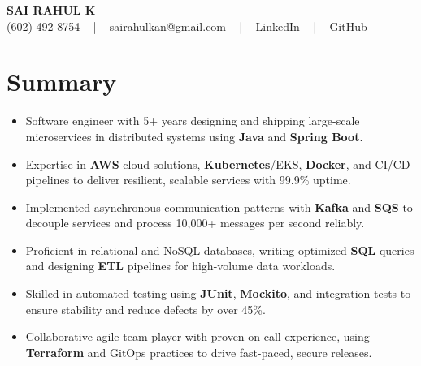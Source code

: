 \documentclass[letterpaper,11pt]{article}
\newcommand{\resumeItem}[1]{
  \item\footnotesize{
    {#1 \vspace{-2pt}}
  }
}
\newcommand{\resumeItemListStart}{\begin{itemize}[leftmargin=*]}
\newcommand{\resumeItemListEnd}{\end{itemize}\vspace{-5pt}}
\begin{document}
\begin{center}
    {\fontsize{14pt}{12pt}\selectfont \textbf{\MakeUppercase{Sai Rahul K}}}\\ \vspace{2pt}
    \fontsize{10pt}{12pt}\selectfont (602) 492-8754 ~ | ~ \href{mailto:sairahulkan@gmail.com}{sairahulkan@gmail.com} ~ | ~
    \href{https://www.linkedin.com/in/rq123/}{\color{blue}\underline{LinkedIn}} ~ | ~
    \href{https://github.com/kanrahuldo}{\color{blue}\underline{GitHub}}~
    \vspace{-8pt}
\end{center}

\section{Summary}
\fontsize{9pt}{10pt}\selectfont
\resumeItemListStart
    \resumeItem{Software engineer with 5+ years designing and shipping large-scale microservices in distributed systems using \textbf{Java} and \textbf{Spring Boot}.}
    \resumeItem{Expertise in \textbf{AWS} cloud solutions, \textbf{Kubernetes}/EKS, \textbf{Docker}, and CI/CD pipelines to deliver resilient, scalable services with 99.9\% uptime.}
    \resumeItem{Implemented asynchronous communication patterns with \textbf{Kafka} and \textbf{SQS} to decouple services and process 10,000+ messages per second reliably.}
    \resumeItem{Proficient in relational and NoSQL databases, writing optimized \textbf{SQL} queries and designing \textbf{ETL} pipelines for high-volume data workloads.}
    \resumeItem{Skilled in automated testing using \textbf{JUnit}, \textbf{Mockito}, and integration tests to ensure stability and reduce defects by over 45\%.}
    \resumeItem{Collaborative agile team player with proven on-call experience, using \textbf{Terraform} and GitOps practices to drive fast-paced, secure releases.}
\resumeItemListEnd
\vspace{-6pt}
\end{document}
